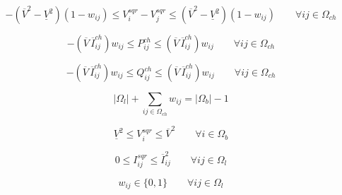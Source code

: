 \begin{tcolorbox}[breakable,pad at break*=1mm,colback=white!10,title =\textbf{Problema de PNLIM para RSD}]
\begin{equation}\label{eq:PNLIM_voltagekeys}
    -(\overline{V}^{2} - \underline{V}^{2})(1-w_{ij}) \leq V_{i}^{sqr} - V_{j}^{sqr} \leq (\overline{V}^{2} - \underline{V}^{2})(1-w_{ij})\qquad\forall ij\in\Omega_{ch}
\end{equation}

\begin{equation}\label{eq:PNLIM_Pch}
    -(\overline{V}\,\overline{I}_{ij}^{ch})w_{ij} \leq P_{ij}^{ch} \leq (\overline{V}\,\overline{I}_{ij}^{ch})w_{ij}\qquad\forall ij\in\Omega_{ch}   
\end{equation}
    
\begin{equation}\label{eq:PNLIM_Qch}
    -(\overline{V}\,\overline{I}_{ij}^{ch})w_{ij} \leq Q_{ij}^{ch} \leq (\overline{V}\,\overline{I}_{ij}^{ch})w_{ij}\qquad\forall ij\in\Omega_{ch}   
\end{equation}

\begin{equation}\label{eq:PNLIM_radialidade}
    |\Omega_{l}| + \sum_{ij\in\Omega_{ch}}w_{ij} = |\Omega_{b}| - 1
\end{equation}

\begin{equation}\label{eq:PNLIM_voltagelim}
    \underline{V}^{2} \leq V_{i}^{sqr} \leq \overline{V}^{2}\qquad\forall i \in\Omega_{b}
\end{equation}

\begin{equation}\label{eq:PNLIM_currentlim}
    0 \leq I_{ij}^{sqr} \leq \overline{I}_{ij}^{2} \qquad\forall ij\in\Omega_{l}
\end{equation}

\begin{equation}
    w_{ij}\in\{0,1\}\qquad\forall ij\in \Omega_{l}
\end{equation}


\end{tcolorbox}



